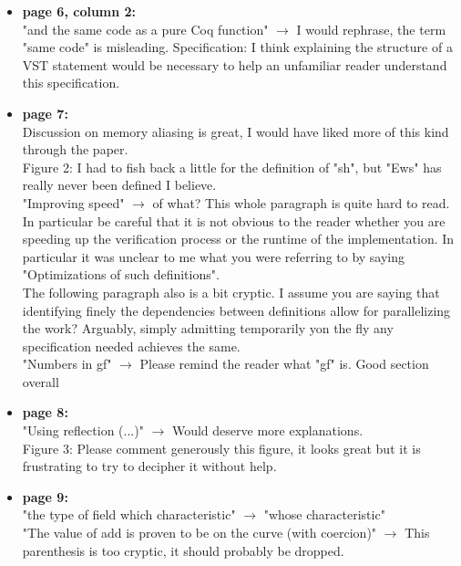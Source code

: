 \begin{itemize}
          \begin{answer}{EEEEEE}
              In our case the fuel is used to garantee to have as an output a list of 32 elements. This allows to prove that for all List of 32 bytes, ListofZn\_fp (ZofList L) = L. With this lemma at hand we can later simplify some of the expressions.
          \end{answer}

    \item \textbf{page 6, column 2:}\\
          "and the same code as a pure Coq function" $\rightarrow$ I would rephrase, the term "same code" is misleading.
          Specification: I think explaining the structure of a VST statement would be necessary to help an unfamiliar reader understand this specification.

    \item \textbf{page 7:}\\
          Discussion on memory aliasing is great, I would have liked more of this kind through the paper.\\
          Figure 2: I had to fish back a little for the definition of "sh", but "Ews" has really never been defined I believe.\\
          "Improving speed" $\rightarrow$ of what? This whole paragraph is quite hard to read. In particular be careful that it is not obvious to the reader whether you are speeding up the verification process or the runtime of the implementation. In particular it was unclear to me what you were referring to by saying "Optimizations of such definitions".\\
          The following paragraph also is a bit cryptic. I assume you are saying that identifying finely the dependencies between definitions allow for parallelizing the work? Arguably, simply admitting temporarily yon the fly any specification needed  achieves the same.\\
          "Numbers in gf" $\rightarrow$ Please remind the reader what "gf" is. Good section overall

    \item \textbf{page 8:}\\
          "Using reflection (...)" $\rightarrow$ Would deserve more explanations.\\
          Figure 3: Please comment generously this figure, it looks great but it is frustrating to try to decipher it without help.

    \item \textbf{page 9:}\\
          {\color{gray}"the type of field which characteristic" $\rightarrow$ "whose characteristic"\\
          "The value of add is proven to be on the curve (with coercion)" $\rightarrow$ This parenthesis is too cryptic, it should probably be dropped.}


\end{itemize}
